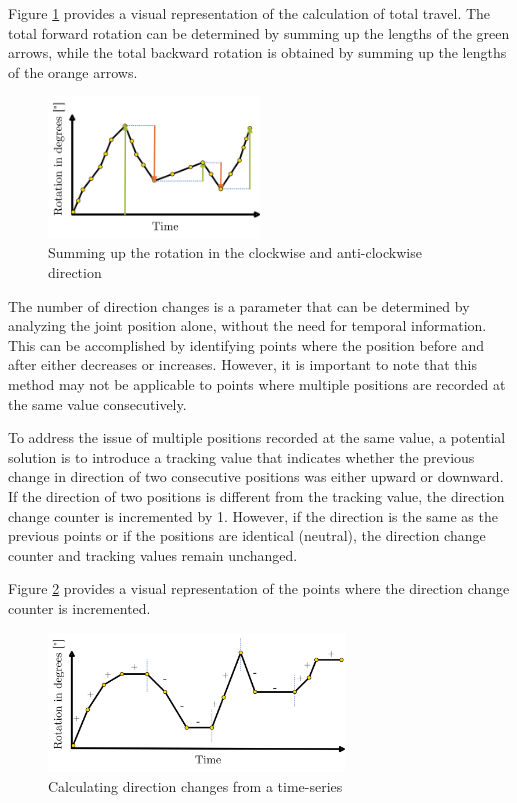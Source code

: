 Figure \ref{travel} provides a visual representation of the calculation of total travel. The total forward rotation can be determined by summing up the lengths of the green arrows, while the total backward rotation is obtained by summing up the lengths of the orange arrows.

\begin{figure}[H]
	\centerline{\includegraphics[width=0.5\textwidth]{figures/travel.png}}
	\caption{Summing up the rotation in the clockwise and anti-clockwise direction }
	\label{travel}
\end{figure}

The number of direction changes is a parameter that can be determined by analyzing the joint position alone, without the need for temporal information. This can be accomplished by identifying points where the position before and after either decreases or increases. However, it is important to note that this method may not be applicable to points where multiple positions are recorded at the same value consecutively.

To address the issue of multiple positions recorded at the same value, a potential solution is to introduce a tracking value that indicates whether the previous change in direction of two consecutive positions was either upward or downward. If the direction of two positions is different from the tracking value, the direction change counter is incremented by 1. However, if the direction is the same as the previous points or if the positions are identical (neutral), the direction change counter and tracking values remain unchanged.

Figure \ref{dirchange} provides a visual representation of the points where the direction change counter is incremented.


\begin{figure}[H]
\centerline{\includegraphics[width=0.7\textwidth]{figures/dirchange.png}}
	\caption{Calculating direction changes from a time-series}
	\label{dirchange}
\end{figure}

